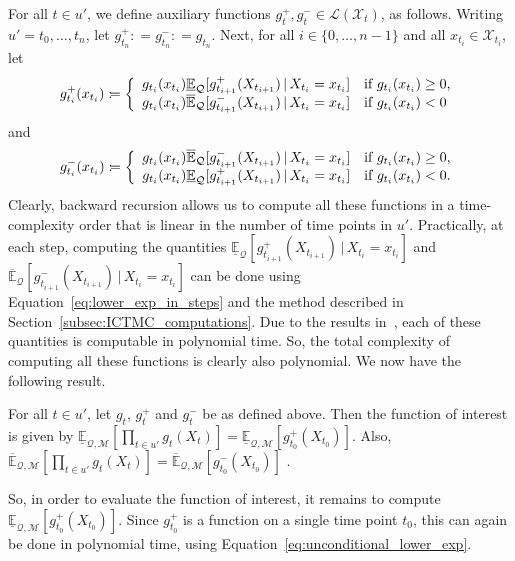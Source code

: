 \documentclass[twoside,11pt]{article}
\newcommand{\states}{\mathcal{X}}
\newcommand{\lexp}{\underline{\mathbb{E}}_{\rateset,\mathcal{M}}}
\newcommand{\uexp}{\overline{\mathbb{E}}_{\rateset,\mathcal{M}}}
\newcommand{\gambles}{\mathcal{L}}
\newcommand{\rateset}{\mathcal{Q}}
\newcommand{\coloneqq}{:\!=}
\begin{document}
For all $t\in u'$, we define auxiliary functions $g_{t}^+,g_{t}^-\in\gambles(\states_{t})$, as follows. Writing $u'=t_0,\ldots,t_{n}$, let $g_{t_{n}}^+\coloneqq g_{t_{n}}^-\coloneqq g_{t_{n}}$. Next,  for all $i\in\{0,\dots,n-1\}$ and all $x_{t_i}\in\states_{t_i}$, let
\begin{equation*}
g_{t_i}^+(x_{t_i}) \coloneqq \left\{\begin{array}{ll}
g_{t_i}(x_{t_i})\underline{\mathbb{E}}_\rateset[g_{t_{i+1}}^+(X_{t_{i+1}})\,\vert\, X_{t_i}=x_{t_i}] & \text{if $g_{t_i}(x_{t_i})\geq 0$,} \\
g_{t_i}(x_{t_i})\overline{\mathbb{E}}_\rateset[g_{t_{i+1}}^-(X_{t_{i+1}})\,\vert\, X_{t_i}=x_{t_i}] & \text{if $g_{t_i}(x_{t_i})<0$}
\end{array}\right.\vspace{-5pt}
\end{equation*}
and
\begin{equation*}
g_{t_i}^-(x_{t_i}) \coloneqq \left\{\begin{array}{ll}
g_{t_i}(x_{t_i})\overline{\mathbb{E}}_\rateset[g_{t_{i+1}}^-(X_{t_{i+1}})\,\vert\, X_{t_i}=x_{t_i}] & \text{if $g_{t_i}(x_{t_i})\geq 0$,} \\
g_{t_i}(x_{t_i})\underline{\mathbb{E}}_\rateset[g_{t_{i+1}}^+(X_{t_{i+1}})\,\vert\, X_{t_i}=x_{t_i}] & \text{if $g_{t_i}(x_{t_i})<0$.}
\end{array}\right.\vspace{5pt}
\end{equation*}
Clearly, backward recursion allows us to compute all these functions in a time-complexity order that is linear in the number of time points in $u'$. Practically, at each step, computing the quantities $\underline{\mathbb{E}}_\rateset[g_{t_{i+1}}^+(X_{t_{i+1}})\,\vert\, X_{t_i}=x_{t_i}]$ and $\overline{\mathbb{E}}_\rateset[g_{t_{i+1}}^-(X_{t_{i+1}})\,\vert\, X_{t_i}=x_{t_i}]$ can be done using Equation~\eqref{eq:lower_exp_in_steps} and the method described in Section~\ref{subsec:ICTMC_computations}. Due to the results in~\citep{krak2016ictmc}, each of these quantities is computable in polynomial time. So, the total complexity of computing all these functions is clearly also polynomial. We now have the following result.
\begin{proposition}\label{prop:computing_product_funcs}
For all $t\in u'$, let $g_{t}$, $g_{t}^+$ and $g_{t}^-$ be as defined above. Then the function of interest is given by
$\lexp\left[\prod_{t\in u'}g_{t}(X_{t})\right] = \lexp\left[g_{t_0}^+(X_{t_0})\right]$. Also,
$\uexp\left[\prod_{t\in u'}g_{t}(X_{t})\right]=\uexp\left[g_{t_0}^-(X_{t_0})\right]$%
.
\end{proposition}
So, in order to evaluate the function of interest, it remains to compute $\lexp\left[g_{t_0}^+(X_{t_0})\right]$. Since $g_{t_0}^+$ is a function on a single time point $t_0$, this can again be done in polynomial time, using Equation~\eqref{eq:unconditional_lower_exp}.
\end{document}
